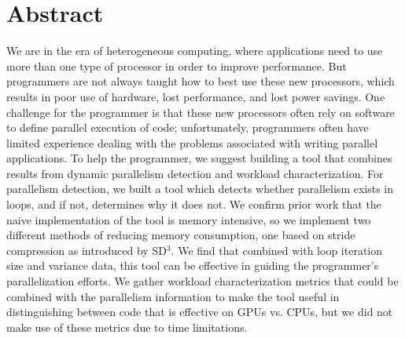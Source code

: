 \documentclass[12pt,twoside]{reedthesis}
\begin{document}
    \tableofcontents
    \listoftables
    \listoffigures

    \chapter*{Abstract}
	
	We are in the era of heterogeneous computing, where applications need to use more than one type of processor in order to improve performance. But programmers are not always taught how to best use these new processors, which results in poor use of hardware, lost performance, and lost power savings. One challenge for the programmer is that these new processors often rely on software to define parallel execution of code; unfortunately, programmers often have limited experience dealing with the problems associated with writing parallel applications. To help the programmer, we suggest building a tool that combines results from dynamic parallelism detection and workload characterization. For parallelism detection, we built a tool which detects whether parallelism exists in loops, and if not, determines why it does not. We confirm prior work that the naive implementation of the tool is memory intensive, so we implement two different methods of reducing memory consumption, one based on stride compression as introduced by SD$^3$. We find that combined with loop iteration size and variance data, this tool can be effective in guiding the programmer's parallelization efforts. %
	We gather workload characterization metrics that could be combined with the parallelism information to make the tool useful in distinguishing between code that is effective on GPUs vs. CPUs, but we did not make use of these metrics due to time limitations. 
	

	


  \mainmatter %
  \pagestyle{fancyplain} %

\end{document}
